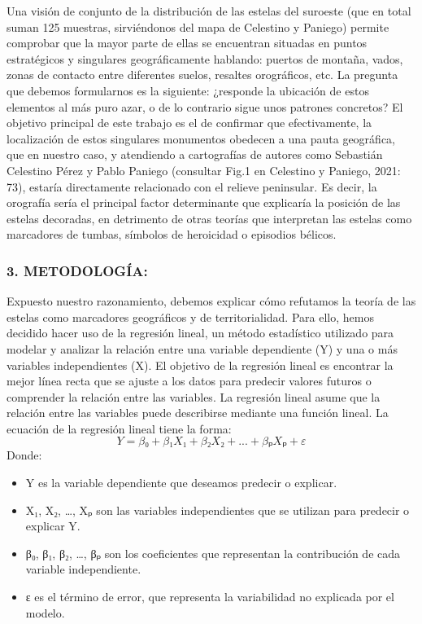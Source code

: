 \documentclass[
]{article}
\providecommand{\tightlist}{%
  \setlength{\itemsep}{0pt}\setlength{\parskip}{0pt}}
\begin{document}
Una visión de conjunto de la distribución de las estelas del suroeste
(que en total suman 125 muestras, sirviéndonos del mapa de Celestino y
Paniego) permite comprobar que la mayor parte de ellas se encuentran
situadas en puntos estratégicos y singulares geográficamente hablando:
puertos de montaña, vados, zonas de contacto entre diferentes suelos,
resaltes orográficos, etc. La pregunta que debemos formularnos es la
siguiente: ¿responde la ubicación de estos elementos al más puro azar, o
de lo contrario sigue unos patrones concretos? El objetivo principal de
este trabajo es el de confirmar que efectivamente, la localización de
estos singulares monumentos obedecen a una pauta geográfica, que en
nuestro caso, y atendiendo a cartografías de autores como Sebastián
Celestino Pérez y Pablo Paniego (consultar Fig.1 en Celestino y Paniego,
2021: 73), estaría directamente relacionado con el relieve peninsular.
Es decir, la orografía sería el principal factor determinante que
explicaría la posición de las estelas decoradas, en detrimento de otras
teorías que interpretan las estelas como marcadores de tumbas, símbolos
de heroicidad o episodios bélicos.

\hypertarget{metodologuxeda}{%
\subsubsection{3. METODOLOGÍA:}\label{metodologuxeda}}

Expuesto nuestro razonamiento, debemos explicar cómo refutamos la teoría
de las estelas como marcadores geográficos y de territorialidad. Para
ello, hemos decidido hacer uso de la regresión lineal, un método
estadístico utilizado para modelar y analizar la relación entre una
variable dependiente (Y) y una o más variables independientes (X). El
objetivo de la regresión lineal es encontrar la mejor línea recta que se
ajuste a los datos para predecir valores futuros o comprender la
relación entre las variables. La regresión lineal asume que la relación
entre las variables puede describirse mediante una función lineal. La
ecuación de la regresión lineal tiene la forma:
\[Y = β₀ + β₁X₁ + β₂X₂ + ... + βₚXₚ + ε\] Donde:

\begin{itemize}
\tightlist
\item
  Y es la variable dependiente que deseamos predecir o explicar.
\item
  X₁, X₂, \ldots, Xₚ son las variables independientes que se utilizan
  para predecir o explicar Y.
\item
  β₀, β₁, β₂, \ldots, βₚ son los coeficientes que representan la
  contribución de cada variable independiente.
\item
  ε es el término de error, que representa la variabilidad no explicada
  por el modelo.
\end{itemize}
\end{document}
